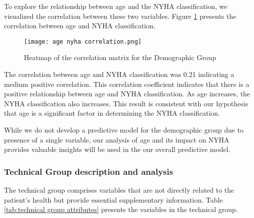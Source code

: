        To explore the relationship between age and the NYHA classification, we visualized the correlation between these two variables. Figure \ref{fig:age nyha correlation} presents the correlation between age and NYHA classification.

        \begin{figure}[H]
        \centering
        \texttt{[image: age nyha correlation.png]}
        \caption{Heatmap of the correlation matrix for the Demographic Group}
        \label{fig:age nyha correlation}
        \end{figure}
        
        The correlation between age and NYHA classification was 0.21 indicating a medium positive correlation. This correlation coefficient indicates that there is a positive relationship between age and NYHA classification. As age increases, the NYHA classification also increases. This result is consistent with our hypothesis that age is a significant factor in determining the NYHA classification.

        While we do not develop a predictive model for the demographic group due to presence of a single variable, our analysis of age and its impact on NYHA provides valuable insights will be used in the our overall predictive model.

\subsubsection{Technical Group description and analysis}
        
        The technical group comprises variables that are not directly related to the patient's health but provide essential supplementary information. Table \ref{tab:technical group attributes} presents the variables in the technical group.

